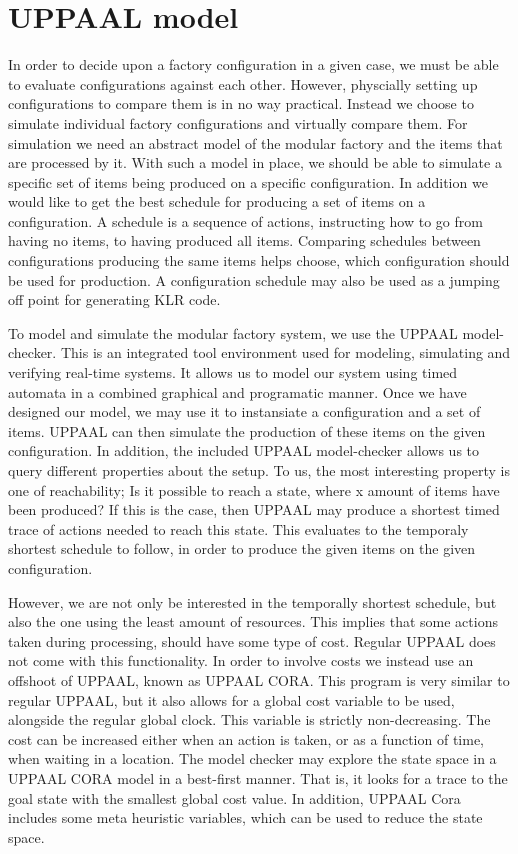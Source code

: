 
\chapter{UPPAAL model}\label{ch:uppaalmodel}
In order to decide upon a factory configuration in a given case, we must be able to evaluate configurations against each other. However, physcially setting up configurations to compare them is in no way practical. Instead we choose to simulate individual factory configurations and virtually compare them. For simulation we need an abstract model of the modular factory and the items that are processed by it. With such a model in place, we should be able to simulate a specific set of items being produced on a specific configuration. In addition we would like to get the best schedule for producing a set of items on a configuration. A schedule is a sequence of actions, instructing how to go from having no items, to having produced all items. Comparing schedules between configurations producing the same items helps choose, which configuration should be used for production. A configuration schedule may also be used as a jumping off point for generating KLR code.

To model and simulate the modular factory system, we use the UPPAAL model-checker\cite{Larsen97uppaalin}. This is an integrated tool environment used for modeling, simulating and verifying real-time systems. It allows us to model our system using timed automata in a combined graphical and programatic manner. Once we have designed our model, we may use it to instansiate a configuration and a set of items. UPPAAL can then simulate the production of these items on the given configuration. In addition, the included UPPAAL model-checker allows us to query different properties about the setup. To us, the most interesting property is one of reachability; Is it possible to reach a state, where x amount of items have been produced? If this is the case, then UPPAAL may produce a shortest timed trace of actions needed to reach this state. This evaluates to the temporaly shortest schedule to follow, in order to produce the given items on the given configuration.

However, we are not only be interested in the temporally shortest schedule, but also the one using the least amount of resources. This implies that some actions taken during processing, should have some type of cost. Regular UPPAAL does not come with this functionality. In order to involve costs we instead use an offshoot of UPPAAL, known as UPPAAL CORA\cite{UPPAALCORA}. This program is very similar to regular UPPAAL, but it also allows for a global cost variable to be used, alongside the regular global clock. This variable is strictly non-decreasing. The cost can be increased either when an action is taken, or as a function of time, when waiting in a location. The model checker may explore the state space in a UPPAAL CORA model in a best-first manner. That is, it looks for a trace to the goal state with the smallest global cost value. In addition, UPPAAL Cora includes some meta heuristic variables, which can be used to reduce the state space.

